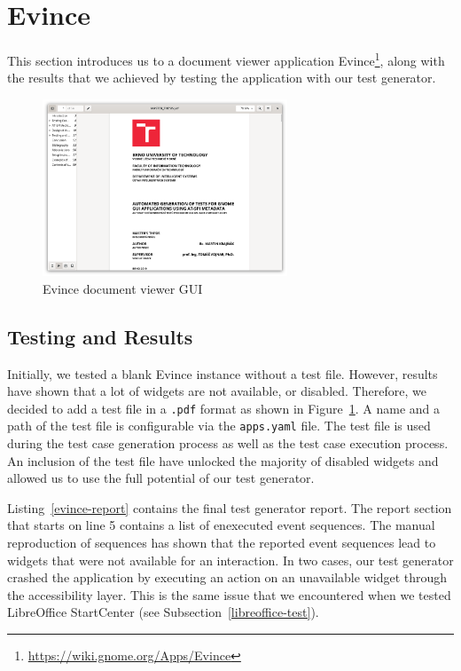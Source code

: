 
\section{Evince}\label{evince}
This section introduces us to a document viewer application Evince\footnote{\url{https://wiki.gnome.org/Apps/Evince}}, along with the results that we achieved by testing the application with our test generator. 

\begin{figure}[H]
	\centering
	\includegraphics[width=0.65\textwidth,clip]{obrazky-figures/evince.png}
	\caption{Evince document viewer GUI}
	\label{evince_gui}
\end{figure}

\subsection*{Testing and Results}
Initially, we tested a blank Evince instance without a test file. However, results have shown that a lot of widgets are not available, or disabled. Therefore, we decided to add a test file in a \texttt{.pdf} format as shown in Figure~\ref{evince_gui}. A name and a path of the test file is configurable via the \texttt{apps.yaml} file. The test file is used during the test case generation process as well as the test case execution process. An inclusion of the test file have unlocked the majority of disabled widgets and allowed us to use the full potential of our test generator. 

Listing~\ref{evince-report} contains the final test generator report. The report section that starts on line 5 contains a list of enexecuted event sequences. The manual reproduction of sequences has shown that the reported event sequences lead to widgets that were not available for an interaction. In two cases, our test generator crashed the application by executing an action on an unavailable widget through the accessibility layer. This is the same issue that we encountered when we tested LibreOffice StartCenter (see Subsection~\ref{libreoffice-test}).

